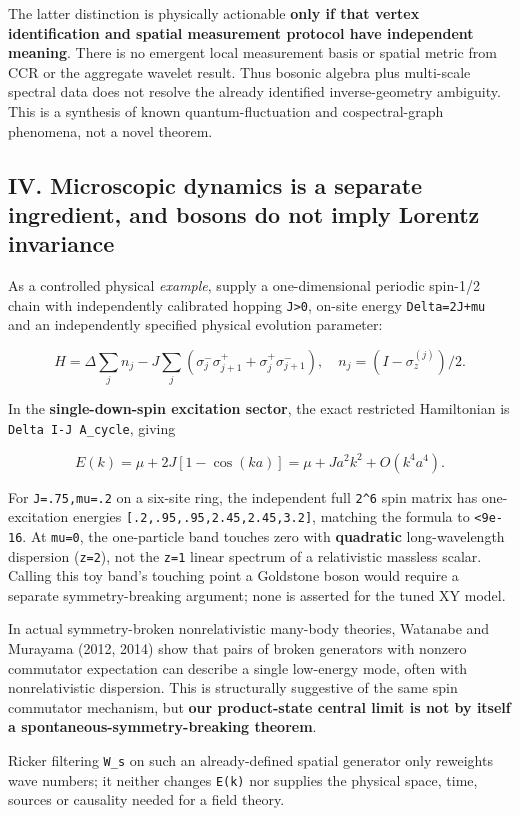 \documentclass[
  10pt,
  a4paper,
]{article}
\begin{document}
The latter distinction is physically actionable \textbf{only if that vertex identification and spatial measurement protocol have independent meaning}. There is no emergent local measurement basis or spatial metric from CCR or the aggregate wavelet result. Thus bosonic algebra plus multi-scale spectral data does not resolve the already identified inverse-geometry ambiguity. This is a synthesis of known quantum-fluctuation and cospectral-graph phenomena, not a novel theorem.

\subsection{IV. Microscopic dynamics is a separate ingredient, and bosons do not imply Lorentz invariance}\label{iv.-microscopic-dynamics-is-a-separate-ingredient-and-bosons-do-not-imply-lorentz-invariance}

As a controlled physical \emph{example}, supply a one-dimensional periodic spin-1/2 chain with independently calibrated hopping \texttt{J\textgreater{}0}, on-site energy \texttt{Delta=2J+mu} and an independently specified physical evolution parameter:

\[
H=\Delta\sum_j n_j-J\sum_j(\sigma^-_j\sigma^+_{j+1}+\sigma^+_j\sigma^-_{j+1}),\quad
n_j=(I-\sigma_z^{(j)})/2.
\]

In the \textbf{single-down-spin excitation sector}, the exact restricted Hamiltonian is \texttt{Delta\ I-J\ A\_cycle}, giving

\[
E(k)=\mu+2J[1-\cos(ka)]=\mu+Ja^2k^2+O(k^4a^4).
\]

For \texttt{J=.75,mu=.2} on a six-site ring, the independent full \texttt{2\^{}6} spin matrix has one-excitation energies \texttt{{[}.2,.95,.95,2.45,2.45,3.2{]}}, matching the formula to \texttt{\textless{}9e-16}. At \texttt{mu=0}, the one-particle band touches zero with \textbf{quadratic} long-wavelength dispersion (\texttt{z=2}), not the \texttt{z=1} linear spectrum of a relativistic massless scalar. Calling this toy band's touching point a Goldstone boson would require a separate symmetry-breaking argument; none is asserted for the tuned XY model.

In actual symmetry-broken nonrelativistic many-body theories, Watanabe and Murayama (2012, 2014) show that pairs of broken generators with nonzero commutator expectation can describe a single low-energy mode, often with nonrelativistic dispersion. This is structurally suggestive of the same spin commutator mechanism, but \textbf{our product-state central limit is not by itself a spontaneous-symmetry-breaking theorem}.

Ricker filtering \texttt{W\_s} on such an already-defined spatial generator only reweights wave numbers; it neither changes \texttt{E(k)} nor supplies the physical space, time, sources or causality needed for a field theory.
\end{document}

